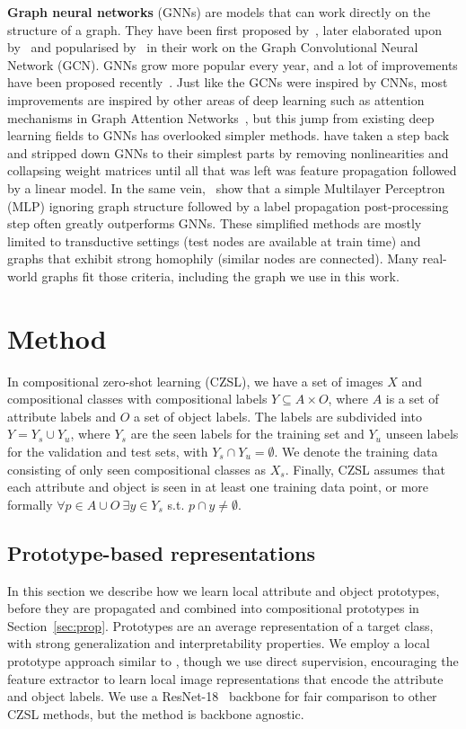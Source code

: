 \documentclass{article}
\begin{document}
\textbf{Graph neural networks} (GNNs) are models that can work directly on the structure of a graph. They have been first proposed by~\citet{gori2005new}, later elaborated upon by~\citet{scarselli2008graph} and popularised by~\citet{kipf2017semi} in their work on the Graph Convolutional Neural Network (GCN). GNNs grow more popular every year, and a lot of improvements have been proposed recently~\citep{wu2020comprehensive}. Just like the GCNs were inspired by CNNs, most improvements are inspired by other areas of deep learning such as attention mechanisms in Graph Attention Networks~\citep{velickovic2018graph}, but this jump from existing deep learning fields to GNNs has overlooked simpler methods. \citet{pmlr-v97-wu19e} have taken a step back and stripped down GNNs to their simplest parts by removing nonlinearities and collapsing weight matrices until all that was left was feature propagation followed by a linear model. In the same vein,~\citet{huang2021combining} show that a simple Multilayer Perceptron (MLP) ignoring graph structure followed by a label propagation post-processing step often greatly outperforms GNNs. These simplified methods are mostly limited to transductive settings (test nodes are available at train time) and graphs that exhibit strong homophily (similar nodes are connected). Many real-world graphs fit those criteria, including the graph we use in this work.

\section{Method}
\label{sec:method}
In compositional zero-shot learning (CZSL), we have a set of images $X$ and compositional classes with compositional labels $Y \subseteq A \times O$, where $A$ is a set of attribute labels and $O$ a set of object labels. The labels are subdivided into $Y = Y_s \cup Y_u$, where $Y_s$ are the seen labels for the training set and $Y_u$ unseen labels for the validation and test sets, with $Y_s \cap Y_u = \emptyset$. We denote the training data consisting of only seen compositional classes as $X_s$. Finally, CZSL assumes that each attribute and object is seen in at least one training data point, or more formally $\forall p \in A \cup O~\exists y \in Y_s$ s.t. $p \cap y \neq \emptyset$.

\subsection{Prototype-based representations}
\label{sec:proto_method}
In this section we describe how we learn local attribute and object prototypes, before they are propagated and combined into compositional prototypes in Section~\ref{sec:prop}. Prototypes are an average representation of a target class, with strong generalization and interpretability properties. We employ a local prototype approach similar to \citet{chen2019looks}, though we use direct supervision, encouraging the feature extractor to learn local image representations that encode the attribute and object labels. We use a ResNet-18~\citep{he2016deep} backbone for fair comparison to other CZSL methods, but the method is backbone agnostic. 
\end{document}

